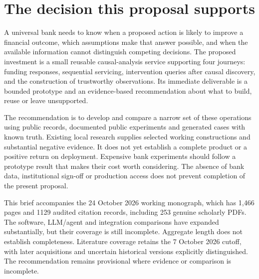 \hypertarget{the-decision-this-proposal-supports}{%
\section{The decision this proposal
supports}\label{the-decision-this-proposal-supports}}

A universal bank needs to know when a proposed action is likely to
improve a financial outcome, which assumptions make that answer
possible, and when the available information cannot distinguish
competing decisions. The proposed investment is a small reusable
causal-analysis service supporting four journeys: funding responses,
sequential servicing, intervention queries after causal discovery, and
the construction of trustworthy observations. Its immediate deliverable
is a bounded prototype and an evidence-based recommendation about what
to build, reuse or leave unsupported.

The recommendation is to develop and compare a narrow set of these
operations using public records, documented public experiments and
generated cases with known truth. Existing local research supplies
selected working constructions and substantial negative evidence. It
does not yet establish a complete product or a positive return on
deployment. Expensive bank experiments should follow a prototype result
that makes their cost worth considering. The absence of bank data,
institutional sign-off or production access does not prevent completion
of the present proposal. \citep{sp13_scope}

This brief accompanies the 24 October 2026 working monograph, which has
1,466 pages and 1129 audited citation records, including 253 genuine
scholarly PDFs. The software, LLM/agent and integration comparisons have
expanded substantially, but their coverage is still incomplete.
Aggregate length does not establish completeness. Literature coverage
retains the 7 October 2026 cutoff, with later acquisitions and uncertain
historical versions explicitly distinguished. The recommendation remains
provisional where evidence or comparison is incomplete.
\citep{sp23nt_reader,sp23lt_reader,sp23dw_reader,sp23sm_reader,sp22wf_reader,sp22ft_reader,sp22si_reader,sp22ob_reader,sp22dk_reader,sp22iv_reader,sp22bs_reader,sp21rr_reader,sp21pr_reader,sp21gs_reader,sp21eo_reader,sp21tr_reader,sp21ae_reader,sp21gr_reader,sp21ck_reader,sp21cx_reader,sp20md_reader,sp20gf_reader,sp20hy_reader,sp20je_reader,sp20nc_reader,sp20gc_reader,sp20ea_reader,sp20vm_reader,sp20pye_reader,sp20fx_reader,sp20pa_reader,sp20rfx_reader}

